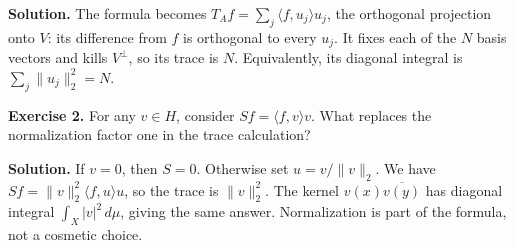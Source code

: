 \textbf{Solution.} The formula becomes \(T_Af=\sum_j\langle f,u_j\rangle u_j\), the orthogonal projection onto \(V\): its difference from \(f\) is orthogonal to every \(u_j\). It fixes each of the \(N\) basis vectors and kills \(V^\perp\), so its trace is \(N\). Equivalently, its diagonal integral is \(\sum_j\|u_j\|_2^2=N\).

\textbf{Exercise 2.} For any \(v\in H\), consider \(Sf=\langle f,v\rangle v\). What replaces the normalization factor one in the trace calculation?

\textbf{Solution.} If \(v=0\), then \(S=0\). Otherwise set \(u=v/\|v\|_2\). We have \(Sf=\|v\|_2^2\langle f,u\rangle u\), so the trace is \(\|v\|_2^2\). The kernel \(v(x)\overline{v(y)}\) has diagonal integral \(\int_X|v|^2\,d\mu\), giving the same answer. Normalization is part of the formula, not a cosmetic choice.
